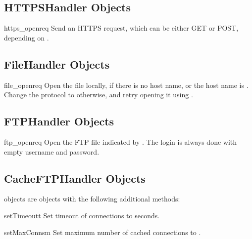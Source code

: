 \subsection{HTTPSHandler Objects \label{https-handler-objects}}

\begin{methoddesc}[HTTPSHandler]{https_open}{req}
Send an HTTPS request, which can be either GET or POST, depending on
.
\end{methoddesc}


\subsection{FileHandler Objects \label{file-handler-objects}}

\begin{methoddesc}[FileHandler]{file_open}{req}
Open the file locally, if there is no host name, or
the host name is . Change the
protocol to  otherwise, and retry opening
it using .
\end{methoddesc}


\subsection{FTPHandler Objects \label{ftp-handler-objects}}

\begin{methoddesc}[FTPHandler]{ftp_open}{req}
Open the FTP file indicated by .
The login is always done with empty username and password.
\end{methoddesc}


\subsection{CacheFTPHandler Objects \label{cacheftp-handler-objects}}

 objects are  objects with
the following additional methods:

\begin{methoddesc}[CacheFTPHandler]{setTimeout}{t}
Set timeout of connections to  seconds.
\end{methoddesc}

\begin{methoddesc}[CacheFTPHandler]{setMaxConns}{m}
Set maximum number of cached connections to .
\end{methoddesc}



